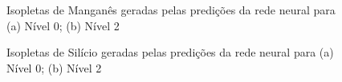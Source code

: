 \documentclass[brazil,tf,epusp]{usp}  %
\begin{document}
\begin{figure}
\caption{Isopletas de Manganês geradas pelas predições da rede neural para (a) Nível 0; (b) Nível 2 }
\label{fig:Mn_NN_isop}
\end{figure}

\begin{figure}
\caption{Isopletas de Silício geradas pelas predições da rede neural para (a) Nível 0; (b) Nível 2 }
\label{fig:Si_NN_isop}
\end{figure}
\end{document}

